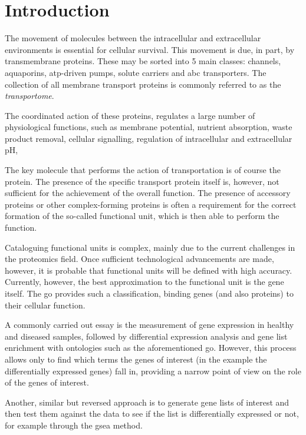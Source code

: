 \section{Introduction}

The movement of molecules between the intracellular and extracellular environments is essential for cellular survival.
This movement is due, in part, by transmembrane proteins.
These may be sorted into 5 main classes: channels, aquaporins, atp-driven pumps, solute carriers and \gls{abc} transporters.
The collection of all membrane transport proteins is commonly referred to as the \textit{transportome}.

The coordinated action of these proteins, regulates a large number of physiological functions, such as membrane potential, nutrient absorption, waste product removal, cellular signalling, regulation of intracellular and extracellular pH, 

The key molecule that performs the action of transportation is of course the protein.
The presence of the specific transport protein itself is, however, not sufficient for the achievement of the overall function.
The presence of accessory proteins or other complex-forming proteins is often a requirement for the correct formation of the so-called functional unit, which is then able to perform the function.

Cataloguing functional units is complex, mainly due to the current challenges in the proteomics field.
Once sufficient technological advancements are made, however, it is probable that functional units will be defined with high accuracy.
Currently, however, the best approximation to the functional unit is the gene itself.
The \gls{go} provides such a classification, binding genes (and also proteins) to their cellular function.

A commonly carried out essay is the measurement of gene expression in healthy and diseased samples, followed by differential expression analysis and gene list enrichment with ontologies such as the aforementioned \gls{go}.
However, this process allows only to find which terms the genes of interest (in the example the differentially expressed genes) fall in, providing a narrow point of view on the role of the genes of interest.

Another, similar but reversed approach is to generate gene lists of interest and then test them against the data to see if the list is differentially expressed or not, for example through the \gls{gsea} method.

